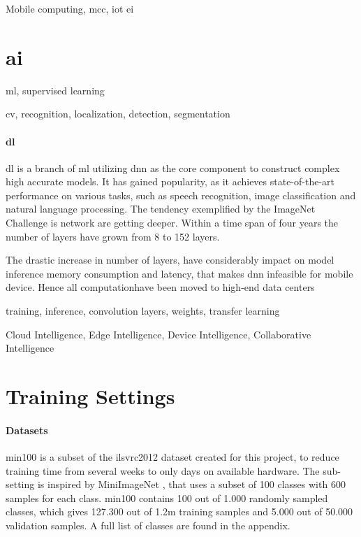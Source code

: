 Mobile computing, \gls{mcc}, \gls{iot} \gls{ei}

\section{\gls{ai}}

\gls{ml}, supervised learning

\gls{cv}, recognition, localization, detection, segmentation

\paragraph{\gls{dl}} 

\gls{dl} is a branch of \gls{ml} utilizing \gls{dnn} as the core component to construct complex high accurate models. It has gained popularity, as it achieves state-of-the-art performance on various tasks, such as speech recognition, image classification and natural language processing. The tendency exemplified by the ImageNet Challenge \cite{russakovsky_imagenet_2015} is network are getting deeper. Within a time span of four years the number of layers have grown from 8 to 152 layers. 

The drastic increase in number of layers, have considerably impact on model inference memory consumption and latency, that makes \gls{dnn} infeasible for mobile device. Hence all computationhave been moved to high-end data centers

training, inference, convolution layers, weights, transfer learning 


Cloud Intelligence, Edge Intelligence, Device Intelligence, Collaborative Intelligence



\section{Training Settings}

\paragraph{Datasets}

\gls{min100} is a subset of the \gls{ilsvrc2012} dataset \cite{russakovsky_imagenet_2015} created for this project, to reduce training time from several weeks to only days on available hardware. The sub-setting is inspired by MiniImageNet \cite{vinyals_matching_2016}, that uses a subset of 100 classes with 600 samples for each class. \gls{min100} contains 100 out of 1.000 randomly sampled classes, which gives 127.300 out of 1.2m training samples and 5.000 out of 50.000 validation samples. A full list of classes are found in the appendix. 

